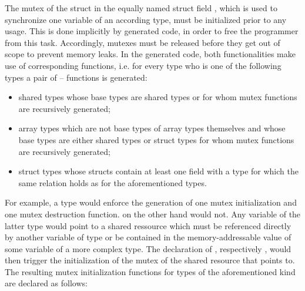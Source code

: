 The mutex of the struct  in the equally named struct field , which is used to synchronize one variable of an according type, must be initialized prior to any usage. This is done implicitly by generated code, in order to free the programmer from this task. Accordingly, mutexes must be released before they get out of scope to prevent memory leaks. In the generated code, both functionalities make use of corresponding functions, i.e. for every type who is one of the following types a pair of -- functions is generated:

\begin{itemize}
\item shared types whose base types are shared types or for whom mutex functions are recursively generated;
\item array types which are not base types of array types themselves and whose base types are either shared types or struct types for whom mutex functions are recursively generated;
\item struct types whose structs contain at least one field with a type for which the same relation holds as for the aforementioned types.
\end{itemize}

For example, a type  would enforce the generation of one mutex initialization and one mutex destruction function.  on the other hand would not. Any variable  of the latter type would point to a shared ressource which must be referenced directly by another variable  of type  or be contained in the memory-addressable value of some variable  of a more complex type. The declaration of , respectively , would then trigger the initialization of the mutex of the shared resource that  points to. The resulting mutex initialization functions for types of the aforementioned kind are declared as follows:

